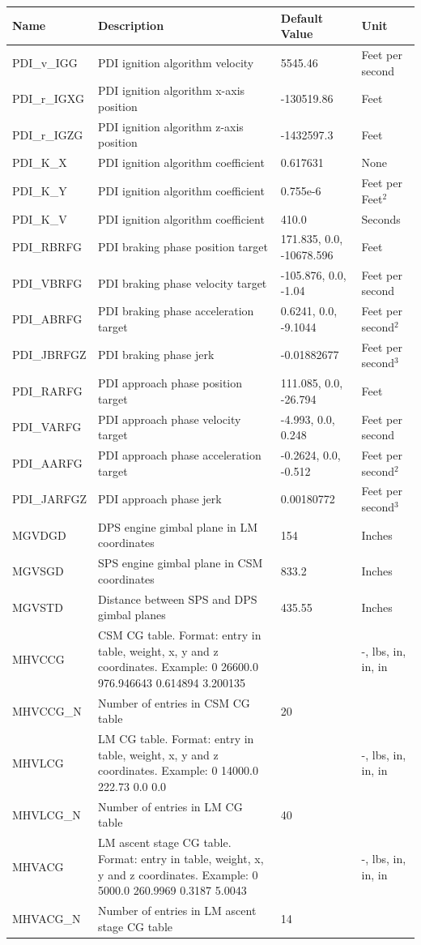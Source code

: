 \documentclass[11pt]{article} %
\begin{document}
\newpage
\begin{tabular}{L{3cm} L{7cm} L{2.5cm} L{1.5cm}}
\hline
\textbf{Name} & \textbf{Description} & \textbf{Default Value} & \textbf{Unit}\\
\hline
PDI\_v\_IGG & PDI ignition algorithm velocity & 5545.46 & Feet per second\\
\hline
PDI\_r\_IGXG & PDI ignition algorithm x-axis position & -130519.86 & Feet\\
\hline
PDI\_r\_IGZG & PDI ignition algorithm z-axis position & -1432597.3 & Feet\\
\hline
PDI\_K\_X & PDI ignition algorithm coefficient & 0.617631 & None\\
\hline
PDI\_K\_Y & PDI ignition algorithm coefficient & 0.755e-6 & Feet per Feet$^2$\\
\hline
PDI\_K\_V & PDI ignition algorithm coefficient & 410.0 & Seconds\\
\hline
PDI\_RBRFG & PDI braking phase position target & 171.835, 0.0, -10678.596 & Feet\\
\hline
PDI\_VBRFG & PDI braking phase velocity target & -105.876, 0.0, -1.04 & Feet per second\\
\hline
PDI\_ABRFG & PDI braking phase acceleration target & 0.6241, 0.0, -9.1044 & Feet per second$^2$\\
\hline
PDI\_JBRFGZ & PDI braking phase jerk & -0.01882677 & Feet per second$^3$\\
\hline
PDI\_RARFG & PDI approach phase position target & 111.085, 0.0, -26.794 & Feet\\
\hline
PDI\_VARFG & PDI approach phase velocity target & -4.993, 0.0, 0.248 & Feet per second\\
\hline
PDI\_AARFG & PDI approach phase acceleration target &  -0.2624, 0.0, -0.512 & Feet per second$^2$\\
\hline
PDI\_JARFGZ & PDI approach phase jerk & 0.00180772 & Feet per second$^3$\\
\hline
MGVDGD&DPS engine gimbal plane in LM coordinates&154&Inches\\
\hline
MGVSGD&SPS engine gimbal plane in CSM coordinates&833.2&Inches\\
\hline
MGVSTD&Distance between SPS and DPS gimbal planes&435.55&Inches\\
\hline
MHVCCG&CSM CG table. Format: entry in table, weight, x, y and z coordinates. Example: 0 26600.0 976.946643 0.614894 3.200135&&-, lbs, in, in, in\\
\hline
MHVCCG\_N&Number of entries in CSM CG table&20&\\
\hline
MHVLCG&LM CG table. Format: entry in table, weight, x, y and z coordinates. Example: 0 14000.0 222.73 0.0 0.0&&-, lbs, in, in, in\\
\hline
MHVLCG\_N&Number of entries in LM CG table&40&\\
\hline
MHVACG&LM ascent stage CG table. Format: entry in table, weight, x, y and z coordinates. Example: 0 5000.0 260.9969 0.3187 5.0043&&-, lbs, in, in, in\\
\hline
MHVACG\_N&Number of entries in LM ascent stage CG table&14&\\
\end{tabular}
\end{document}
